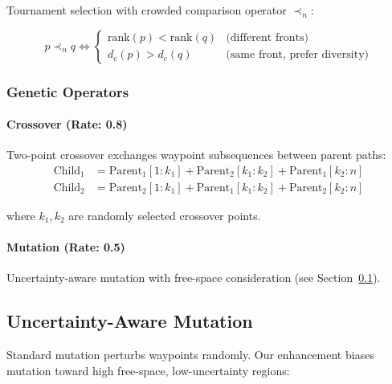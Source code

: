 Tournament selection with crowded comparison operator $\prec_n$:

\begin{equation}
p \prec_n q \iff \begin{cases}
\text{rank}(p) < \text{rank}(q) & \text{(different fronts)} \\
d_c(p) > d_c(q) & \text{(same front, prefer diversity)}
\end{cases}
\label{eq:crowded_comparison}
\end{equation}

\subsubsection{Genetic Operators}

\paragraph{Crossover (Rate: 0.8)}
Two-point crossover exchanges waypoint subsequences between parent paths:
\begin{equation}
\begin{aligned}
\text{Child}_1 &= \text{Parent}_1[1:k_1] + \text{Parent}_2[k_1:k_2] + \text{Parent}_1[k_2:n] \\
\text{Child}_2 &= \text{Parent}_2[1:k_1] + \text{Parent}_1[k_1:k_2] + \text{Parent}_2[k_2:n]
\end{aligned}
\label{eq:crossover}
\end{equation}

where $k_1, k_2$ are randomly selected crossover points.

\paragraph{Mutation (Rate: 0.5)}
Uncertainty-aware mutation with free-space consideration (see Section~\ref{sec:uncertainty_mutation}).

\subsection{Uncertainty-Aware Mutation}
\label{sec:uncertainty_mutation}

Standard mutation perturbs waypoints randomly. Our enhancement biases mutation toward high free-space, low-uncertainty regions:

